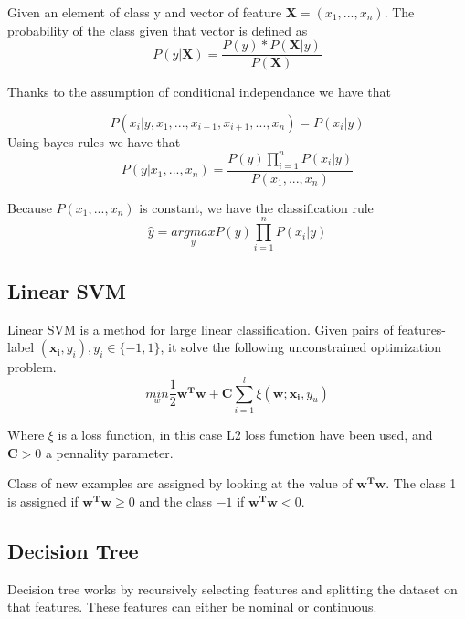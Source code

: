 Given an element of class y and vector of feature $\mathbf{X} = (x_1,...,x_n)$. The probability of the class given that vector is defined as 
\begin{equation}
	P(y | \mathbf{X}) = \frac{P(y)*P(\mathbf{X} | y)}{P(\mathbf{X})}
\end{equation}

Thanks to the assumption of conditional independance we have that 

\begin{equation}
	P(x_i |y,x_1, ...,x_{i-1},x_{i+1},...,x_n) = P(x_i | y)
\end{equation}
Using bayes rules we have that
\begin{equation}
	P(y|x_1,...,x_n) = \frac{P(y)\prod_{i=1}^n P(x_i | y)}{P(x_1,...,x_n)}
\end{equation}

Because $P(x_1,...,x_n)$ is constant, we have the classification rule 
\begin{equation}
	\hat{y} = \underset{y}{argmax} P(y)\prod_{i=1}^n P(x_i | y)
\end{equation}

\subsection{Linear SVM}
Linear SVM is a method for large linear classification. Given pairs of features-label $(\mathbf{x_i}, y_i), y_i \in \{-1, 1\}$, it solve the following unconstrained optimization problem. 
\begin{equation}
	\underset{w}{min} \frac{1}{2} \mathbf{w^Tw} + \mathbf{C} \sum_{i=1}^l \xi(\mathbf{w;x_i},y_u)
\end{equation}

Where $\xi$ is a loss function, in this case L2 loss function have been used, and $\mathbf{C} > 0$ a pennality parameter. 

Class of new examples are assigned by looking at the value of $\mathbf{w^Tw}$. The class 1 is assigned if $\mathbf{w^Tw} \geq 0$ and the class $-1$ if $\mathbf{w^Tw} < 0$.

\subsection{Decision Tree\cite{Rokach:2014:DMD:2755359}}
Decision tree works by recursively selecting features and splitting the dataset on that features. These features can either be nominal or continuous. \\

